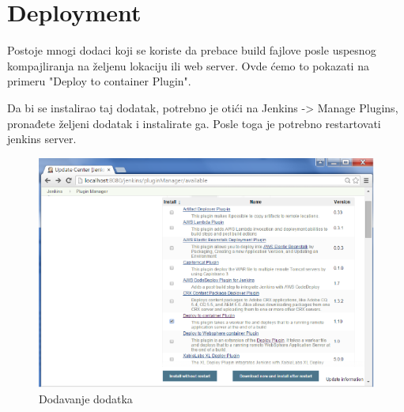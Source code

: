
\section{Deployment}

Postoje mnogi dodaci koji se koriste da prebace build fajlove posle uspesnog kompajliranja na željenu lokaciju ili web server. Ovde ćemo to pokazati na primeru "Deploy to container Plugin". 


Da bi se instalirao taj dodatak, potrebno je otići na Jenkins -> Manage Plugins, pronađete željeni dodatak i instalirate ga. Posle toga je potrebno restartovati jenkins server. 
\begin{figure}
\begin{center}
\includegraphics[scale=0.45]{slike/deploy_to_container_plugin.png}
\end{center}
\caption{Dodavanje dodatka}
\label{fig:deploy_to_container_plugin}
\end{figure}








